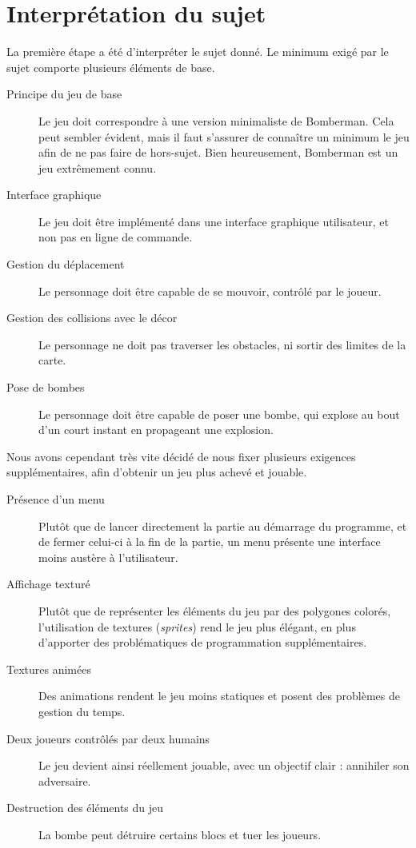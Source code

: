 \documentclass[a4paper,10pt]{report}
\begin{document}
\section{Interprétation du sujet}
La première étape a été d'interpréter le sujet donné. Le minimum exigé par le sujet comporte plusieurs éléments de base.
\begin{description}
 \item[Principe du jeu de base] Le jeu doit correspondre à une version minimaliste de Bomberman. Cela peut sembler évident, mais il faut s'assurer de connaître un minimum le jeu afin de ne pas faire de hors-sujet. Bien heureusement, Bomberman est un jeu extrêmement connu.
 \item[Interface graphique] Le jeu doit être implémenté dans une interface graphique utilisateur, et non pas en ligne de commande.
 \item[Gestion du déplacement] Le personnage doit être capable de se mouvoir, contrôlé par le joueur.
 \item[Gestion des collisions avec le décor] Le personnage ne doit pas traverser les obstacles, ni sortir des limites de la carte.
 \item[Pose de bombes] Le personnage doit être capable de poser une bombe, qui explose au bout d'un court instant en propageant une explosion.
\end{description}

Nous avons cependant très vite décidé de nous fixer plusieurs exigences supplémentaires, afin d'obtenir un jeu plus achevé et jouable.
\begin{description}
 \item[Présence d'un menu] Plutôt que de lancer directement la partie au démarrage du programme, et de fermer celui-ci à la fin de la partie, un menu présente une interface moins austère à l'utilisateur.
 \item[Affichage texturé] Plutôt que de représenter les éléments du jeu par des polygones colorés, l'utilisation de textures (\textit{sprites}) rend le jeu plus élégant, en plus d'apporter des problématiques de programmation supplémentaires.
 \item[Textures animées] Des animations rendent le jeu moins statiques et posent des problèmes de gestion du temps.
 \item[Deux joueurs contrôlés par deux humains] Le jeu devient ainsi réellement jouable, avec un objectif clair : annihiler son adversaire.
 \item[Destruction des éléments du jeu] La bombe peut détruire certains blocs et tuer les joueurs.
\end{description}
\end{document}
